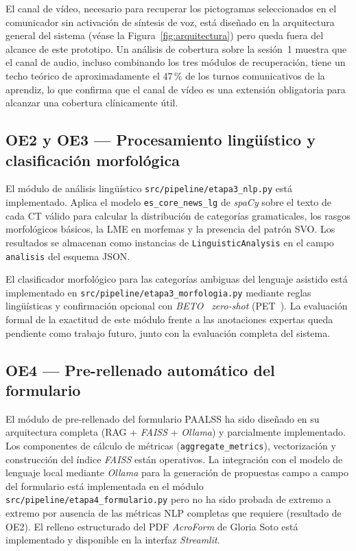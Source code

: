 El canal de vídeo, necesario para recuperar los pictogramas seleccionados en el
comunicador sin activación de síntesis de voz, está diseñado en la arquitectura
general del sistema (véase la Figura~\ref{fig:arquitectura}) pero queda fuera del
alcance de este prototipo. Un análisis de cobertura sobre la sesión~1 muestra que el
canal de audio, incluso combinando los tres módulos de recuperación, tiene un techo
teórico de aproximadamente el 47\,\% de los turnos comunicativos de la aprendiz,
lo que confirma que el canal de vídeo es una extensión obligatoria para alcanzar una
cobertura clínicamente útil.

\subsection{OE2 y OE3 — Procesamiento lingüístico y clasificación morfológica}
\label{subsec:conc_oe2_oe3}

El módulo de análisis lingüístico \texttt{src/pipeline/etapa3\_nlp.py} está
implementado. Aplica el modelo \texttt{es\_core\_news\_lg} de \emph{spaCy} sobre el
texto de cada \ac{CT} válido para calcular la distribución de categorías
gramaticales, los rasgos morfológicos básicos, la \ac{LME} en morfemas y la presencia
del patrón \ac{SVO}. Los resultados se almacenan como instancias de
\texttt{LinguisticAnalysis} en el campo \texttt{analisis} del esquema \ac{JSON}.

El clasificador morfológico para las categorías ambiguas del lenguaje asistido está
implementado en \texttt{src/pipeline/etapa3\_morfologia.py} mediante reglas lingüísticas
y confirmación opcional con \emph{BETO}~\cite{beto_morphological} \emph{zero-shot}
(\ac{PET}~\cite{fewshot_clinical_nlp}). La evaluación formal de la exactitud de este
módulo frente a las anotaciones expertas queda pendiente como trabajo futuro, junto
con la evaluación completa del sistema.

\subsection{OE4 — Pre-rellenado automático del formulario}
\label{subsec:conc_oe4}

El módulo de pre-rellenado del formulario \ac{PAALSS} ha sido diseñado en su
arquitectura completa (\ac{RAG} + \emph{FAISS} + \emph{Ollama}) y parcialmente
implementado. Los componentes de cálculo de métricas (\texttt{aggregate\_metrics}),
vectorización y construcción del índice \emph{FAISS} están operativos. La integración
con el modelo de lenguaje local mediante \emph{Ollama} para la generación de
propuestas campo a campo del formulario está implementada en el módulo
\texttt{src/pipeline/etapa4\_formulario.py} pero no ha sido probada de extremo a extremo
por ausencia de las métricas \ac{NLP} completas que requiere (resultado de OE2).
El relleno estructurado del \ac{PDF} \emph{AcroForm} de Gloria Soto está implementado
y disponible en la interfaz \emph{Streamlit}.

